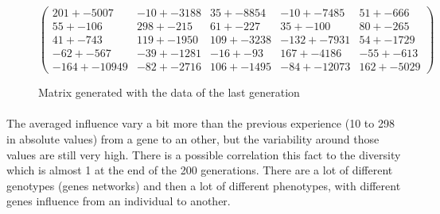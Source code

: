 \documentclass[]{report} %
\begin{document}
    \begin{figure}[H] 
            \centering
            \small
    $
            \begin{pmatrix}
                201 +- 5007 & -10 +- 3188 & 35 +- 8854 & -10 +- 7485 & 51 +- 666 \\
                55 +- 106 & 298 +- 215 & 61 +- 227 & 35 +- 100 & 80 +- 265 \\
                41 +- 743 & 119 +- 1950 & 109 +- 3238 & -132 +- 7931 & 54 +- 1729 \\
                -62 +- 567 & -39 +- 1281 & -16 +- 93 & 167 +- 4186 & -55 +- 613 \\
                -164 +- 10949 & -82 +- 2716 & 106 +- 1495 & -84 +- 12073 & 162 +- 5029  
            \end{pmatrix}
    $
            \caption{\footnotesize Matrix generated with the data of the last generation}
            \label{mat:ps300xg200xmr1-10-2}
    \end{figure}    
    \paragraph*{}
    The averaged influence vary a bit more than the previous experience (10 to 298 in absolute values) from a gene to an other, but the variability around those values are still very high. 
    There is a possible correlation this fact to the diversity which is almost 1 at the end of the 200 generations. 
    There are a lot of different genotypes (genes networks) and then a lot of different phenotypes, with different genes influence from an individual to another.

      
    \newpage
\end{document}
